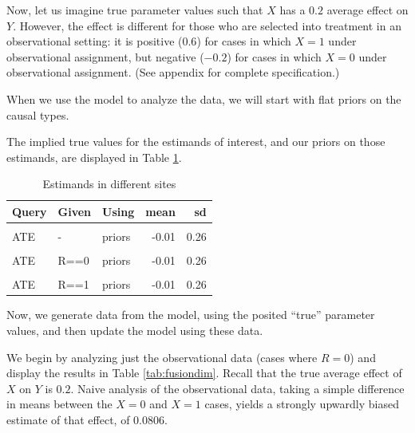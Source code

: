 \documentclass[
  12pt,
]{book}
\begin{document}
Now, let us imagine true parameter values such that \(X\) has a \(0.2\) average effect on \(Y\). However, the effect is different for those who are selected into treatment in an observational setting: it is positive (\(0.6\)) for cases in which \(X=1\) under observational assignment, but negative (\(-0.2\)) for cases in which \(X=0\) under observational assignment. (See appendix for complete specification.)

When we use the model to analyze the data, we will start with flat priors on the causal types.

The implied true values for the estimands of interest, and our priors on those estimands, are displayed in Table \ref{tab:fusionestimands}.

\begin{table}

\caption{\label{tab:fusionestimands}Estimands in different sites}
\centering
\begin{tabular}[t]{lllrr}
\toprule
Query & Given & Using & mean & sd\\
\midrule
\cellcolor{gray!6}{ATE} & \cellcolor{gray!6}{-} & \cellcolor{gray!6}{parameters} & \cellcolor{gray!6}{0.20} & \cellcolor{gray!6}{}\\
ATE & - & priors & -0.01 & 0.26\\
\cellcolor{gray!6}{ATE} & \cellcolor{gray!6}{R==0} & \cellcolor{gray!6}{parameters} & \cellcolor{gray!6}{0.20} & \cellcolor{gray!6}{}\\
ATE & R==0 & priors & -0.01 & 0.26\\
\cellcolor{gray!6}{ATE} & \cellcolor{gray!6}{R==1} & \cellcolor{gray!6}{parameters} & \cellcolor{gray!6}{0.20} & \cellcolor{gray!6}{}\\
\addlinespace
ATE & R==1 & priors & -0.01 & 0.26\\
\bottomrule
\end{tabular}
\end{table}

Now, we generate data from the model, using the posited ``true'' parameter values, and then update the model using these data.

We begin by analyzing just the observational data (cases where \(R=0\)) and display the results in Table \ref{tab:fusiondim}. Recall that the true average effect of \(X\) on \(Y\) is \(0.2\). Naive analysis of the observational data, taking a simple difference in means between the \(X=0\) and \(X=1\) cases, yields a strongly upwardly biased estimate of that effect, of 0.0806.
\end{document}
